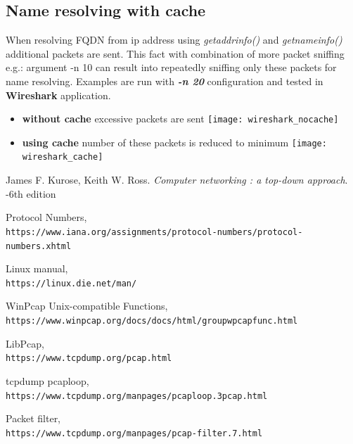 \documentclass{article}
\begin{document}
\newpage
\subsection{Name resolving with cache}
When resolving FQDN from ip address using \textit{getaddrinfo()} and \textit{getnameinfo()} additional packets are sent. This fact with combination of more packet sniffing e.g.: argument -n 10 can result into repeatedly sniffing only these packets for name resolving.\newline
Examples are run with \textit{\textbf{-n 20}} configuration and tested in \textbf{Wireshark} application.

\begin{itemize}
  \item \textbf{without cache} excessive packets are sent\newline
  \texttt{[image: wireshark\_nocache]}
 \item \textbf{using cache} number of these packets is reduced to minimum\newline
  \texttt{[image: wireshark\_cache]}
\end{itemize}
\newpage


\begin{thebibliography}{9}

James F. Kurose, Keith W. Ross. 
\textit{Computer networking : a top-down approach}. 
-6th edition

Protocol Numbers,
\\\texttt{https://www.iana.org/assignments/protocol-numbers/protocol-numbers.xhtml}

Linux manual,
\\\texttt{https://linux.die.net/man/}

WinPcap Unix-compatible Functions,
\\\texttt{https://www.winpcap.org/docs/docs/html/group\textunderscore \textunderscore wpcapfunc.html}

LibPcap,
\\\texttt{https://www.tcpdump.org/pcap.html}

tcpdump pcap\textunderscore loop,
\\\texttt{https://www.tcpdump.org/manpages/pcap\textunderscore loop.3pcap.html}

Packet filter,
\\\texttt{https://www.tcpdump.org/manpages/pcap-filter.7.html}

\end{thebibliography}

	
	
\end{document}
